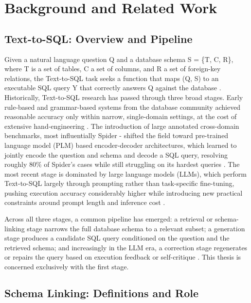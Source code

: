 \chapter{Background and Related Work}\label{ch:2}

\section{Text-to-SQL: Overview and Pipeline}\label{sec:2-1}

Given a natural language question Q and a database schema S = \{T, C, R\}, where T is a set of tables, C a set of columns, and R a set of foreign-key relations, the Text-to-SQL task seeks a function that maps (Q, S) to an executable SQL query Y that correctly answers Q against the database \citep{dong2023,safdarian2025}. Historically, Text-to-SQL research has passed through three broad stages. Early rule-based and grammar-based systems from the database community achieved reasonable accuracy only within narrow, single-domain settings, at the cost of extensive hand-engineering \citep{qin2022}. The introduction of large annotated cross-domain benchmarks, most influentially Spider \citep{yu2018} - shifted the field toward pre-trained language model (PLM) based encoder-decoder architectures, which learned to jointly encode the question and schema and decode a SQL query, resolving roughly 80\% of Spider's cases while still struggling on its hardest queries \citep{liu2024}. The most recent stage is dominated by large language models (LLMs), which perform Text-to-SQL largely through prompting rather than task-specific fine-tuning, pushing execution accuracy considerably higher while introducing new practical constraints around prompt length and inference cost \citep{liu2024,dong2023}.

Across all three stages, a common pipeline has emerged: a retrieval or schema-linking stage narrows the full database schema to a relevant subset; a generation stage produces a candidate SQL query conditioned on the question and the retrieved schema; and increasingly in the LLM era, a correction stage regenerates or repairs the query based on execution feedback or self-critique \citep{maamari2024}. This thesis is concerned exclusively with the first stage.

\section{Schema Linking: Definitions and Role}\label{sec:2-2}

